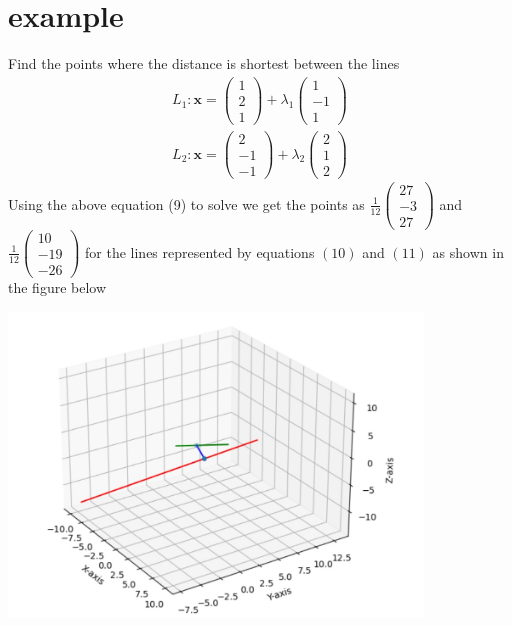 \documentclass[journal,12pt,twocolumn]{IEEEtran}
\begin{document}
\section{example}
Find the points where the distance is shortest between the lines \\
\begin{align}
    L_1\colon \bm{x}= \begin{pmatrix}1\\2\\1\end{pmatrix}+\lambda_1\begin{pmatrix}1\\-1\\1\end{pmatrix}\\
    L_2\colon \bm{x}= \begin{pmatrix}2\\-1\\-1\end{pmatrix}+\lambda_2\begin{pmatrix}2\\1\\2\end{pmatrix}
\end{align}
Using the above equation (9) to solve we get the points as $\frac{1}{12}\begin{pmatrix}27\\-3\\27\end{pmatrix}$ and $\frac{1}{12}\begin{pmatrix}10\\-19\\-26\end{pmatrix}$ for the lines represented by equations $(10)$ and $(11)$ as shown in the figure below\\
\begin{center}
    \includegraphics[width=11cm]{assignment2.jpg}
\end{center}
\end{document}
